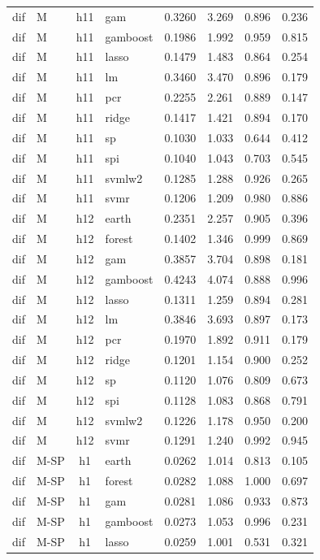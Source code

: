 \begin{ThreePartTable}
\begin{longtable}[t]{llclcccc}
dif & M & h11 & gam & 0.3260 & 3.269 & 0.896 & 0.236\\
dif & M & h11 & gamboost & 0.1986 & 1.992 & 0.959 & 0.815\\
dif & M & h11 & lasso & 0.1479 & 1.483 & 0.864 & 0.254\\
dif & M & h11 & lm & 0.3460 & 3.470 & 0.896 & 0.179\\
dif & M & h11 & pcr & 0.2255 & 2.261 & 0.889 & 0.147\\
dif & M & h11 & ridge & 0.1417 & 1.421 & 0.894 & 0.170\\
dif & M & h11 & sp & 0.1030 & 1.033 & 0.644 & 0.412\\
dif & M & h11 & spi & 0.1040 & 1.043 & 0.703 & 0.545\\
dif & M & h11 & svmlw2 & 0.1285 & 1.288 & 0.926 & 0.265\\
dif & M & h11 & svmr & 0.1206 & 1.209 & 0.980 & 0.886\\
\addlinespace
dif & M & h12 & earth & 0.2351 & 2.257 & 0.905 & 0.396\\
dif & M & h12 & forest & 0.1402 & 1.346 & 0.999 & 0.869\\
dif & M & h12 & gam & 0.3857 & 3.704 & 0.898 & 0.181\\
dif & M & h12 & gamboost & 0.4243 & 4.074 & 0.888 & 0.996\\
dif & M & h12 & lasso & 0.1311 & 1.259 & 0.894 & 0.281\\
dif & M & h12 & lm & 0.3846 & 3.693 & 0.897 & 0.173\\
dif & M & h12 & pcr & 0.1970 & 1.892 & 0.911 & 0.179\\
dif & M & h12 & ridge & 0.1201 & 1.154 & 0.900 & 0.252\\
dif & M & h12 & sp & 0.1120 & 1.076 & 0.809 & 0.673\\
dif & M & h12 & spi & 0.1128 & 1.083 & 0.868 & 0.791\\
dif & M & h12 & svmlw2 & 0.1226 & 1.178 & 0.950 & 0.200\\
dif & M & h12 & svmr & 0.1291 & 1.240 & 0.992 & 0.945\\
\addlinespace
dif & M-SP & h1 & earth & 0.0262 & 1.014 & 0.813 & 0.105\\
dif & M-SP & h1 & forest & 0.0282 & 1.088 & 1.000 & 0.697\\
dif & M-SP & h1 & gam & 0.0281 & 1.086 & 0.933 & 0.873\\
dif & M-SP & h1 & gamboost & 0.0273 & 1.053 & 0.996 & 0.231\\
dif & M-SP & h1 & lasso & 0.0259 & 1.001 & 0.531 & 0.321\\

\end{longtable}
\end{ThreePartTable}
